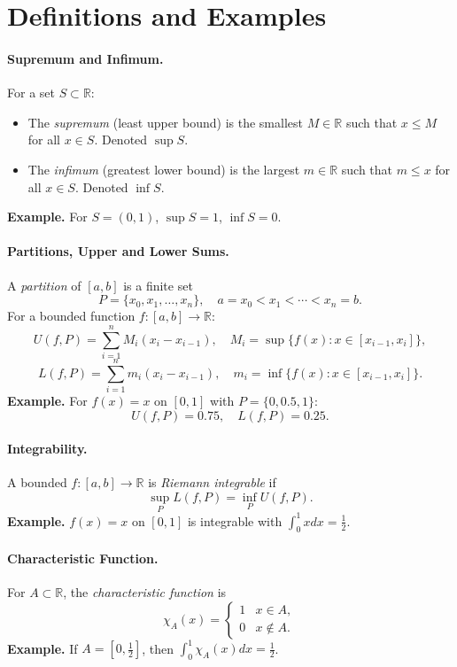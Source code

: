 \section*{Definitions and Examples}

\paragraph{Supremum and Infimum.}
For a set $S \subset \mathbb{R}$:
\begin{itemize}
  \item The \emph{supremum} (least upper bound) is the smallest $M \in \mathbb{R}$ such that $x \leq M$ for all $x \in S$. Denoted $\sup S$.
  \item The \emph{infimum} (greatest lower bound) is the largest $m \in \mathbb{R}$ such that $m \leq x$ for all $x \in S$. Denoted $\inf S$.
\end{itemize}
\textbf{Example.} For $S=(0,1)$, $\sup S = 1$, $\inf S = 0$.

\paragraph{Partitions, Upper and Lower Sums.}
A \emph{partition} of $[a,b]$ is a finite set
\[
P = \{x_0, x_1, \dots, x_n\}, \quad a = x_0 < x_1 < \cdots < x_n = b.
\]
For a bounded function $f:[a,b]\to\mathbb{R}$:
\[
U(f,P) = \sum_{i=1}^n M_i (x_i - x_{i-1}), \quad M_i = \sup\{ f(x) : x \in [x_{i-1}, x_i]\},
\]
\[
L(f,P) = \sum_{i=1}^n m_i (x_i - x_{i-1}), \quad m_i = \inf\{ f(x) : x \in [x_{i-1}, x_i]\}.
\]
\textbf{Example.} For $f(x) = x$ on $[0,1]$ with $P=\{0,0.5,1\}$:
\[
U(f,P) = 0.75, \quad L(f,P) = 0.25.
\]

\paragraph{Integrability.}
A bounded $f:[a,b]\to\mathbb{R}$ is \emph{Riemann integrable} if
\[
\sup_P L(f,P) = \inf_P U(f,P).
\]
\textbf{Example.} $f(x)=x$ on $[0,1]$ is integrable with $\int_0^1 x dx = \tfrac{1}{2}$.

\paragraph{Characteristic Function.}
For $A \subset \mathbb{R}$, the \emph{characteristic function} is
\[
\chi_A(x) = \begin{cases}
1 & x \in A, \\
0 & x \notin A.
\end{cases}
\]
\textbf{Example.} If $A=[0,\tfrac{1}{2}]$, then $\int_0^1 \chi_A(x) dx = \tfrac{1}{2}$.

